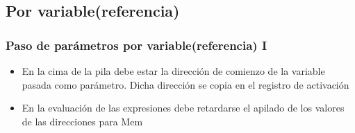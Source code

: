 \documentclass[hyperref={pdfpagelabels=false},tree-dvips,compress]{beamer}
\begin{document}
\subsection{Por variable(referencia)}
\begin{frame}[fragile]
\frametitle{Paso de parámetros por variable(referencia) I}

\begin{itemize}[<+->]
	\item En la cima de la pila debe estar la dirección de comienzo de la variable pasada como parámetro. Dicha dirección se copia en el registro de activación
	\item En la evaluación de las expresiones debe retardarse el apilado de los valores de las direcciones para Mem
\end{itemize}


\end{frame}
\end{document}
